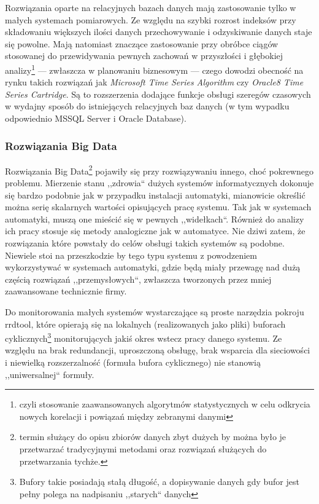 \documentclass[a4paper,polish,12pt,twoside]{article}
\begin{document}
	Rozwiązania oparte na relacyjnych bazach danych mają zastosowanie tylko w małych systemach pomiarowych. Ze względu na szybki rozrost indeksów przy składowaniu większych ilości danych przechowywanie i odzyskiwanie danych staje się powolne. Mają natomiast znaczące zastosowanie przy obróbce ciągów stosowanej do przewidywania pewnych zachowań w przyszłości i głębokiej analizy\footnote{czyli stosowanie zaawansowanych algorytmów statystycznych w celu odkrycia nowych korelacji i powiązań między zebranymi danymi} --- zwłaszcza w planowaniu biznesowym --- czego dowodzi obecność na rynku takich rozwiązań jak \textit{Microsoft Time Series Algorithm} czy \textit{Oracle8 Time Series Cartridge}. Są to rozszerzenia dodające funkcje obsługi szeregów czasowych w wydajny sposób do istniejących relacyjnych baz danych (w tym wypadku odpowiednio MSSQL Server i Oracle Database).

\subsubsection{Rozwiązania Big Data}
	Rozwiązania Big Data\footnote{termin służący do opisu zbiorów danych zbyt dużych by można było je przetwarzać tradycyjnymi metodami oraz rozwiązań służących do przetwarzania tychże.} pojawiły się przy rozwiązywaniu innego, choć pokrewnego problemu. Mierzenie stanu ,,zdrowia`` dużych systemów informatycznych dokonuje się bardzo podobnie jak w przypadku instalacji automatyki, mianowicie określić można serię skalarnych wartości opisujących pracę systemu. Tak jak w systemach automatyki, muszą one mieścić się w pewnych ,,widełkach``. Również do analizy ich pracy stosuje się metody analogiczne jak w automatyce. Nie dziwi zatem, że rozwiązania które powstały do celów obsługi takich systemów są podobne. Niewiele stoi na przeszkodzie by tego typu systemu z powodzeniem wykorzystywać w systemach automatyki, gdzie będą miały przewagę nad dużą częścią rozwiązań ,,przemysłowych``, zwłaszcza tworzonych przez mniej zaawansowane technicznie firmy.

Do monitorowania małych systemów wystarczające są proste narzędzia pokroju rrdtool\cite{rrdtool}, które opierają się na lokalnych (realizowanych jako pliki) buforach cyklicznych\footnote{Bufory takie posiadają stałą długość, a dopisywanie danych gdy bufor jest pełny polega na nadpisaniu ,,starych`` danych} monitorujących jakiś okres wstecz pracy danego systemu. Ze względu na brak redundancji, uproszczoną obsługę, brak wsparcia dla sieciowości i niewielką rozszerzalność (formuła bufora cyklicznego) nie stanowią ,,uniwersalnej`` formuły.
\end{document}
